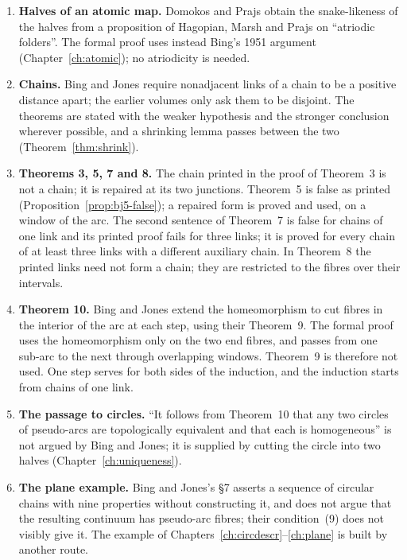 \begin{enumerate}
\item \textbf{Halves of an atomic map.} Domokos and Prajs obtain the snake-likeness of the halves from a proposition of Hagopian, Marsh and Prajs on
``atriodic folders''. The formal proof uses instead Bing's 1951 argument (Chapter~\ref{ch:atomic}); no atriodicity is needed.
\item \textbf{Chains.} Bing and Jones require nonadjacent links of a chain to be a positive distance apart; the earlier volumes only ask them to be disjoint.
The theorems are stated with the weaker hypothesis and the stronger conclusion wherever possible, and a shrinking lemma passes between the two
(Theorem~\ref{thm:shrink}).
\item \textbf{Theorems 3, 5, 7 and 8.} The chain printed in the proof of Theorem~3 is not a chain; it is repaired at its two junctions. Theorem~5 is false
as printed (Proposition~\ref{prop:bj5-false}); a repaired form is proved and used, on a window of the arc. The second sentence of Theorem~7 is false for
chains of one link and its printed proof fails for three links; it is proved for every chain of at least three links with a different auxiliary chain. In
Theorem~8 the printed links need not form a chain; they are restricted to the fibres over their intervals.
\item \textbf{Theorem 10.} Bing and Jones extend the homeomorphism to cut fibres in the interior of the arc at each step, using their Theorem~9. The formal
proof uses the homeomorphism only on the two end fibres, and passes from one sub-arc to the next through overlapping windows. Theorem~9 is therefore not
used. One step serves for both sides of the induction, and the induction starts from chains of one link.
\item \textbf{The passage to circles.} ``It follows from Theorem~10 that any two circles of pseudo-arcs are topologically equivalent and that each is
homogeneous'' is not argued by Bing and Jones; it is supplied by cutting the circle into two halves (Chapter~\ref{ch:uniqueness}).
\item \textbf{The plane example.} Bing and Jones's \S7 asserts a sequence of circular chains with nine properties without constructing it, and does not argue
that the resulting continuum has pseudo-arc fibres; their condition~(9) does not visibly give it. The example of Chapters~\ref{ch:circdescr}--\ref{ch:plane}
is built by another route.
\end{enumerate}

